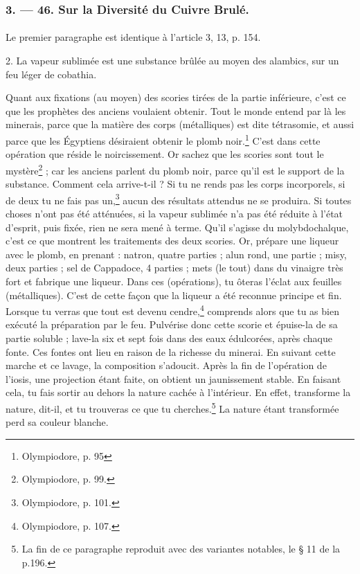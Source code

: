 \documentclass[a4paper, 11pt, oneside, polutonikogreek, french]{article}
\begin{document}
\subsubsection{3. --- 46. Sur la Diversité du Cuivre Brulé.}
\paragraph{}
Le premier paragraphe est identique à l'article 3, 13, p. 154.

2. La vapeur sublimée est une substance brûlée au moyen des alambics, sur un feu léger de cobathia.

Quant aux fixations (au moyen) des scories tirées de la partie inférieure, c'est ce que les prophètes des anciens voulaient obtenir. Tout le monde entend par là les minerais, parce que la matière des corps (métalliques) est dite tétrasomie, et aussi parce que les Égyptiens désiraient obtenir le plomb noir.\footnote{Olympiodore, p. 95} C'est dans cette opération que réside le noircissement. Or sachez que les scories sont tout le mystère\footnote{Olympiodore, p. 99.} ; car les anciens parlent du plomb noir, parce qu'il est le support de la substance. Comment cela arrive-t-il ? Si tu ne rends pas les corps incorporels, si de deux tu ne fais pas un,\footnote{Olympiodore, p. 101.} aucun des résultats attendus ne se produira. Si toutes choses n'ont pas été atténuées, si la vapeur sublimée n'a pas été réduite à l'état d'esprit, puis fixée, rien ne sera mené à terme. Qu'il s'agisse du molybdochalque, c'est ce que montrent les traitements des deux scories. Or, prépare une liqueur avec le plomb, en prenant : natron, quatre parties ; alun rond, une partie ; misy, deux parties ; sel de Cappadoce, 4 parties ; mets (le tout) dans du vinaigre très fort et fabrique une liqueur. Dans ces (opérations), tu ôteras l'éclat aux feuilles (métalliques). C'est de cette façon que la liqueur a été reconnue principe et fin. Lorsque tu verras que tout est devenu cendre,\footnote{Olympiodore, p. 107.} comprends alors que tu as bien exécuté la préparation par le feu. Pulvérise donc cette scorie et épuise-la de sa partie soluble ; lave-la six et sept fois dans des eaux édulcorées, après chaque fonte. Ces fontes ont lieu en raison de la richesse du minerai. En suivant cette marche et ce lavage, la composition s'adoucit. Après la fin de l'opération de l'iosis, une projection étant faite, on obtient un jaunissement stable. En faisant cela, tu fais sortir au dehors la nature cachée à l'intérieur. En effet, transforme la nature, dit-il, et tu trouveras ce que tu cherches.\footnote{La fin de ce paragraphe reproduit avec des variantes notables, le § 11 de la p.196.} La nature étant transformée perd sa couleur blanche.
\end{document}
